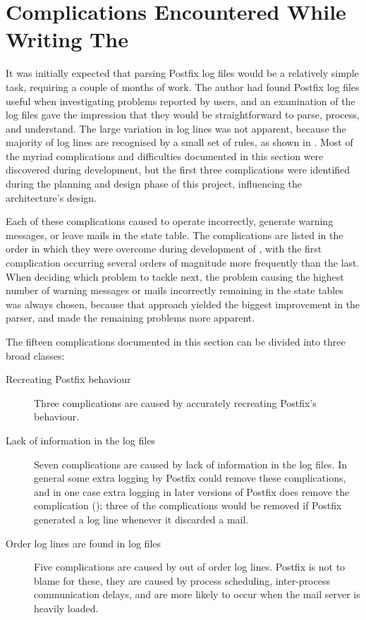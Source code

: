 \section{Complications Encountered While Writing The \parsernamelong{}}

\label{complications}

It was initially expected that parsing Postfix log files would be a
relatively simple task, requiring a couple of months of work.  The author
had found Postfix log files useful when investigating problems reported by
users, and an examination of the log files gave the impression that they
would be straightforward to parse, process, and understand.  The large
variation in log lines was not apparent, because the majority of log lines
are recognised by a small set of rules, as shown in .  Most of the myriad complications and difficulties documented in
this section were discovered during \parsernames{} development, but the
first three complications were identified during the planning and design
phase of this project, influencing the architecture's design.

Each of these complications caused \parsername{} to operate incorrectly,
generate warning messages, or leave mails in the state table.  The
complications are listed in the order in which they were overcome during
development of \parsername{}, with the first complication occurring several
orders of magnitude more frequently than the last.  When deciding which
problem to tackle next, the problem causing the highest number of warning
messages or mails incorrectly remaining in the state tables was always
chosen, because that approach yielded the biggest improvement in the
parser, and made the remaining problems more apparent.

The fifteen complications documented in this section can be divided into
three broad classes:

\begin{description}

    \item [Recreating Postfix behaviour] Three complications are caused by
        \parsername{} accurately recreating Postfix's behaviour.

    \item [Lack of information in the log files] Seven complications are
        caused by lack of information in the log files.  In general some
        extra logging by Postfix could remove these complications, and in
        one case extra logging in later versions of Postfix does remove the
        complication (); three
        of the complications would be removed if Postfix generated a log
        line whenever it discarded a mail.

    \item [Order log lines are found in log files] Five complications are
        caused by out of order log lines.  Postfix is not to blame for
        these, they are caused by process scheduling, inter-process
        communication delays, and are more likely to occur when the mail
        server is heavily loaded.

\end{description}

